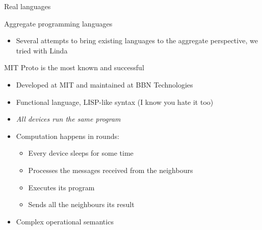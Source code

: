 \documentclass[presentation]{beamer}\mode<presentation>{\usetheme{sapere}}
\begin{document}
\begin{frame}[fragile]{Real languages}
\begin{block}{Aggregate programming languages}
   \begin{itemize}
    \item Several attempts to bring existing languages to the aggregate perspective, we tried with Linda \cite{VPB-COORD2012}
   \end{itemize}
\end{block}
  \begin{block} {MIT Proto \cite{proto} is the most known and successful}
   \begin{itemize}
    \item Developed at MIT and maintained at BBN Technologies
    \item Functional language, LISP-like syntax (I know you hate it too)
    \item \emph{All devices run the same program}
    \item Computation happens in rounds:
    \begin{itemize}
      \item Every device sleeps for some time
      \item Processes the messages received from the neighbours
      \item Executes its program
      \item Sends all the neighbours its result
    \end{itemize}
    \item Complex operational semantics
   \end{itemize}
  \end{block}
\end{frame}
\end{document}
